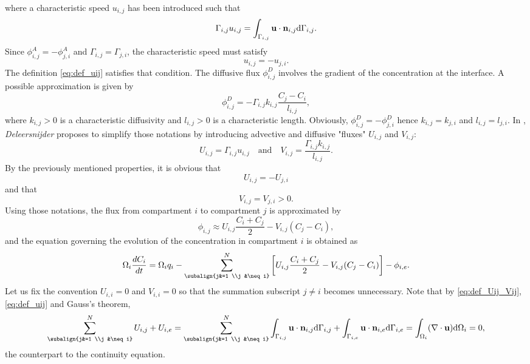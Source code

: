 where a characteristic speed $u_{i,j}$ has been introduced such that
\begin{equation} \label{eq:def_uij}
	\Gamma_{i,j}u_{i,j} = \int_{\Gamma_{i,j}}\mathbf u \cdot \mathbf n_{i,j} \mathrm d\Gamma_{i,j}.
\end{equation}
Since $\phi_{i,j}^A = - \phi_{j,i}^A$ and $\Gamma_{i,j} = \Gamma_{j,i}$, the characteristic speed must satisfy
\begin{equation}
	u_{i,j} = - u_{j,i}.
\end{equation}
The definition \eqref{eq:def_uij} satisfies that condition.
The diffusive flux $\phi_{i,j}^D$ involves the gradient of the concentration at the interface. A possible approximation is given by
\begin{equation}
	\phi_{i,j}^D = - \Gamma_{i,j} k_{i,j} \frac{C_j-C_i}{l_{i,j}},
\end{equation}
where $k_{i,j} > 0$ is a characteristic diffusivity and $l_{i,j} > 0$ is a characteristic length. Obviously, $\phi_{i,j}^D = -\phi_{j,i}^D$ hence $k_{i,j} = k_{j,i}$ and $l_{i,j} = l_{j,i}$. In \cite{deleersnijder2014compartment}, \textit{Deleersnijder} proposes to simplify those notations by introducing advective and diffusive "fluxes" $U_{i,j}$ and $V_{i,j}$:
\begin{equation} \label{eq:def_Uij_Vij}
	U_{i,j} = \Gamma_{i,j}u_{i,j} \quad \mbox{and} \quad V_{i,j} = \frac{\Gamma_{i,j}k_{i,j}}{l_{i,j}}.
\end{equation}
By the previously mentioned properties, it is obvious that 
\begin{equation} \label{eq:Uprop}
	U_{i,j} = -U_{j,i}
\end{equation} 
and that 
\begin{equation} \label{eq:Vprop}
	V_{i,j} = V_{j,i} > 0.
\end{equation}
Using those notations, the flux from compartment $i$ to compartment $j$ is approximated by
\begin{equation}
	\phi_{i,j} \approx U_{i,j} \frac{C_i + C_j}{2} - V_{i,j}(C_j - C_i),
\end{equation}
and the equation governing the evolution of the concentration in compartment $i$ is obtained as
\begin{equation} \label{eq:compartmentmodel}
	\Omega_i \frac{dC_i}{dt} = \Omega_i q_i - \sum_{\subalign{j&=1 \\j &\neq i}}^N \left[ U_{i,j}\frac{C_i + C_j}{2} - V_{i,j} (C_j-C_i)\right] - \phi_{i,e}.
\end{equation}
Let us fix the convention $U_{i,i} = 0$ and $V_{i,i} = 0$ so that the summation subscript $j \neq i$ becomes unnecessary.
Note that by \eqref{eq:def_Uij_Vij}, \eqref{eq:def_uij} and Gauss's theorem,
\begin{equation} \label{eq:continuitycompartment}
	\sum_{\subalign{j&=1 \\j &\neq i}}^N U_{i,j} + U_{i,e} = \sum_{\subalign{j&=1 \\j &\neq i}}^N \int_{\Gamma_{i,j}}\b u \cdot \b n_{i,j} \rm d\Gamma_{i,j} + \int_{\Gamma_{i,e}}\b u \cdot \b n_{i,e} \rm d\Gamma_{i,e} = \int_{\Omega_{i}} (\nabla \cdot \b u) \rm d\Omega_{i} = 0,
\end{equation}
the counterpart to the continuity equation.